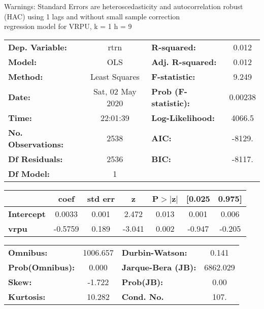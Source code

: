 Warnings: \newline
 [1] Standard Errors are heteroscedasticity and autocorrelation robust (HAC) using 1 lags and without small sample correction\\ 

regression model for VRPU, k = 1 h = 9\begin{center}
\begin{tabular}{lclc}
\toprule
\textbf{Dep. Variable:}    &       rtrn       & \textbf{  R-squared:         } &     0.012   \\
\textbf{Model:}            &       OLS        & \textbf{  Adj. R-squared:    } &     0.012   \\
\textbf{Method:}           &  Least Squares   & \textbf{  F-statistic:       } &     9.249   \\
\textbf{Date:}             & Sat, 02 May 2020 & \textbf{  Prob (F-statistic):} &  0.00238    \\
\textbf{Time:}             &     22:01:39     & \textbf{  Log-Likelihood:    } &    4066.5   \\
\textbf{No. Observations:} &        2538      & \textbf{  AIC:               } &    -8129.   \\
\textbf{Df Residuals:}     &        2536      & \textbf{  BIC:               } &    -8117.   \\
\textbf{Df Model:}         &           1      & \textbf{                     } &             \\
\bottomrule
\end{tabular}
\begin{tabular}{lcccccc}
                   & \textbf{coef} & \textbf{std err} & \textbf{z} & \textbf{P$> |$z$|$} & \textbf{[0.025} & \textbf{0.975]}  \\
\midrule
\textbf{Intercept} &       0.0033  &        0.001     &     2.472  &         0.013        &        0.001    &        0.006     \\
\textbf{vrpu}      &      -0.5759  &        0.189     &    -3.041  &         0.002        &       -0.947    &       -0.205     \\
\bottomrule
\end{tabular}
\begin{tabular}{lclc}
\textbf{Omnibus:}       & 1006.657 & \textbf{  Durbin-Watson:     } &    0.141  \\
\textbf{Prob(Omnibus):} &   0.000  & \textbf{  Jarque-Bera (JB):  } & 6862.029  \\
\textbf{Skew:}          &  -1.722  & \textbf{  Prob(JB):          } &     0.00  \\
\textbf{Kurtosis:}      &  10.282  & \textbf{  Cond. No.          } &     107.  \\
\bottomrule
\end{tabular}
\end{center}

